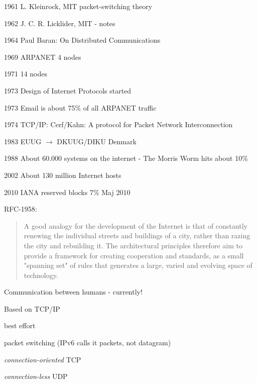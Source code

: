 \documentclass[Screen16to9,17pt]{foils}
\begin{document}
\begin{list2}
\item[1961]  L. Kleinrock, MIT packet-switching theory
\item[1962]  J. C. R. Licklider, MIT - notes
\item[1964]  Paul Baran: On Distributed Communications
\item[1969]  ARPANET 4 nodes
\item[1971]  14 nodes
\item[1973]  Design of Internet Protocols started
\item[1973]  Email is about 75\% of all ARPANET traffic
\item[1974]  TCP/IP: Cerf/Kahn: A protocol for Packet
        Network Interconnection
\item[1983]  EUUG $\rightarrow$ DKUUG/DIKU Denmark
\item[1988]  About 60.000 systems on the internet -
        The Morris Worm hits about 10\%
\item[2002] About 130 million Internet hosts
\item[2010] IANA reserved blocks 7\% Maj 2010 
\end{list2}


RFC-1958:
\begin{quote}
 A good analogy for the development of the Internet is that of
 constantly renewing the individual streets and buildings of a city,
 rather than razing the city and rebuilding it. The architectural
 principles therefore aim to provide a framework for creating
 cooperation and standards, as a small "spanning set" of rules that
 generates a large, varied and evolving space of technology.
\end{quote}


\begin{list1}
\item Communication between humans - currently!
\item Based on TCP/IP
\begin{list2}
\item best effort
\item packet switching (IPv6 calls it packets, not datagram)
\item \emph{connection-oriented} TCP
\item \emph{connection-less} UDP
\end{list2}
\end{list1}
\end{document}
